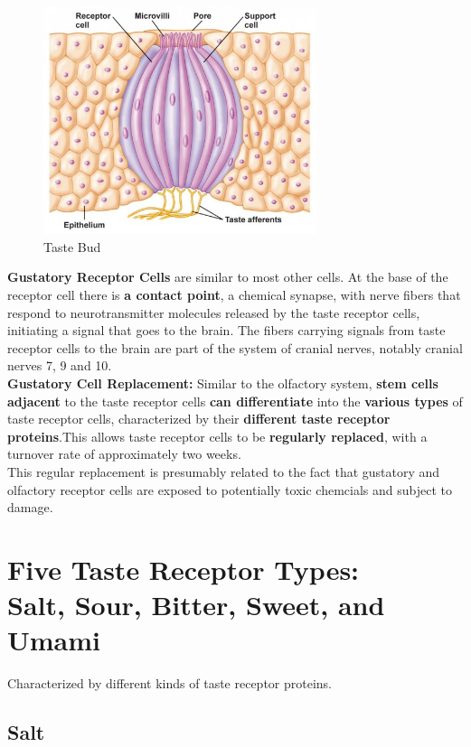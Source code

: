 \documentclass{article}
\begin{document}
\begin{figure}[htp]
\centering
\includegraphics[width=8cm]{images/tastebud.jpg}
\caption{Taste Bud}
\label{fig: TBUD}
\end{figure}

\noindent \textbf{Gustatory Receptor Cells} are similar to most other cells. At the base of the receptor cell there is \textbf{a contact point}, a chemical synapse, with nerve fibers that respond to neurotransmitter molecules released by the taste receptor cells, initiating a signal that goes to the brain. The fibers carrying signals from taste receptor cells to the brain are part of the system of cranial nerves, notably cranial nerves 7, 9 and 10. \\

\noindent \textbf{Gustatory Cell Replacement:} Similar to the olfactory system,\textbf{ stem cells adjacent} to the taste receptor cells \textbf{can differentiate} into the \textbf{various types} of taste receptor cells, characterized by their \textbf{different taste receptor proteins}.This allows taste receptor cells to be \textbf{regularly replaced}, with a turnover rate of approximately two weeks. \\ 
This regular replacement is presumably related to the fact that gustatory and olfactory receptor cells are exposed to potentially toxic chemcials and subject to damage. \\

\newpage
\section{Five Taste Receptor Types:\\ Salt, Sour, Bitter, Sweet, and Umami}
Characterized by different kinds of taste receptor proteins.

\subsection{Salt}
\end{document}
